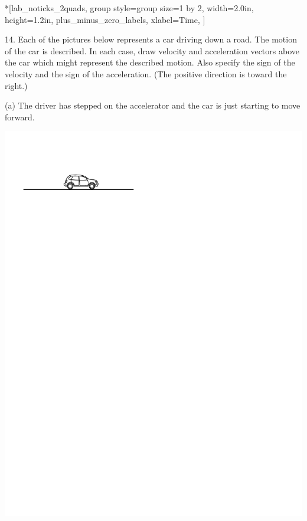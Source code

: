 
\begin{lab_groupplot}*{}[lab_noticks_2quads,
	group style={group size=1 by 2},
	width=2.0in,  height=1.2in,
	plus_minus_zero_labels,
	xlabel=Time,
	]
\nextgroupplot[
	ylabel=Velocity,
	]
\nextgroupplot[
	ylabel=Acceleration,
	]
\end{lab_groupplot}

14. Each of the pictures below represents a car driving down a road. The motion
of the car is described. In each case, draw velocity and acceleration vectors
above the car which might represent the described motion. Also specify the sign
of the velocity and the sign of the acceleration. (The positive direction is toward the right.)

(a) The driver has stepped on the accelerator and the car is just starting to
move forward.

\vspace{0.3cm}
{\par\centering \includegraphics{slowing/car_on_ground.pdf} \par}
\vspace{0.3cm}

